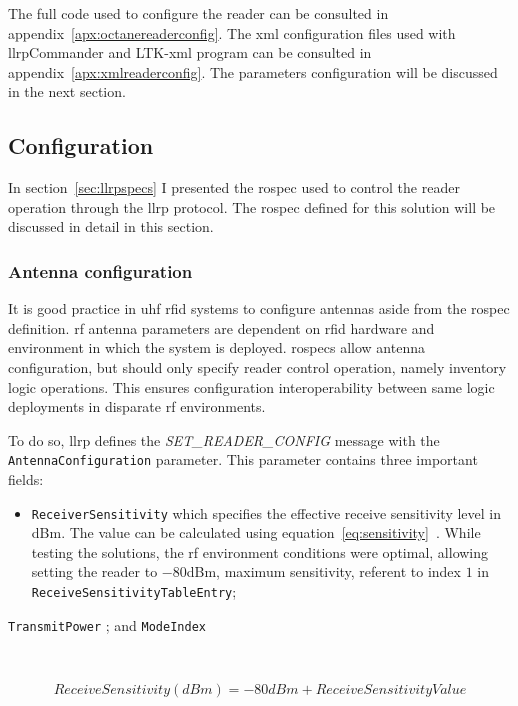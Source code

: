 The full code used to configure the reader can be consulted in appendix~\ref{apx:octanereaderconfig}.
The \ac{xml} configuration files used with \ac{llrp}Commander and LTK-\acs{xml} program can be consulted in appendix~\ref{apx:xmlreaderconfig}.
The parameters configuration will be discussed in the next section.

\subsection{Configuration}

In section~\ref{sec:llrpspecs} I presented the \ac{rospec} used to control the reader operation through the \ac{llrp} protocol. The \ac{rospec} defined for this solution will be discussed in detail in this section.

\subsubsection{Antenna configuration}

It is good practice in \ac{uhf} \ac{rfid} systems to configure antennas aside from the \ac{rospec} definition. \ac{rf} antenna parameters are dependent on \ac{rfid} hardware and environment in which the system is deployed. \acp{rospec} allow antenna configuration, but should only specify reader control operation, namely inventory logic operations. This ensures configuration interoperability between same logic deployments in disparate \ac{rf} environments.

To do so, \ac{llrp} defines the \textit{SET\_READER\_CONFIG} message with the \texttt{AntennaConfiguration} parameter.
This parameter contains three important fields:

\begin{itemize}
    \item \texttt{ReceiverSensitivity} which specifies the effective receive sensitivity level in dBm. The value can be calculated using equation~\ref{eq:sensitivity}~\cite{ImpinjOctaneLLRP}. While testing the solutions, the \ac{rf} environment conditions were optimal, allowing setting the reader to $-80$dBm, maximum sensitivity, referent to index $1$ in \texttt{ReceiveSensitivityTableEntry};
\end{itemize}

\texttt{TransmitPower} ; and \texttt{ModeIndex}

~\cite{SettingReceiveSensitivity}

\begin{equation}
    Receive Sensitivity (dBm) = -80 dBm + ReceiveSensitivityValue
    \label{eq:sensitivity}
\end{equation}

